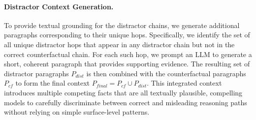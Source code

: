 \documentclass[10pt, a4paper]{article}
\begin{document}
\paragraph{Distractor Context Generation.} 
To provide textual grounding for the distractor chains, we generate additional paragraphs corresponding to their unique hops. Specifically, we identify the set of all unique distractor hops that appear in any distractor chain but not in the correct counterfactual chain. For each such hop, we prompt an LLM to generate a short, coherent paragraph that provides supporting evidence. The resulting set of distractor paragraphs $P_{dist}$ is then combined with the counterfactual paragraphs $P_{cf}$ to form the final context $P_{final} = P_{cf} \cup P_{dist}$. This integrated context introduces multiple competing facts that are all textually plausible, compelling models to carefully discriminate between correct and misleading reasoning paths without relying on simple surface-level patterns.


\begin{table}[t]
\centering
{}
\caption{Ablation results on CRiT-QA under different evidence settings.}
\label{tab:ablation}
\end{table}
\end{document}
